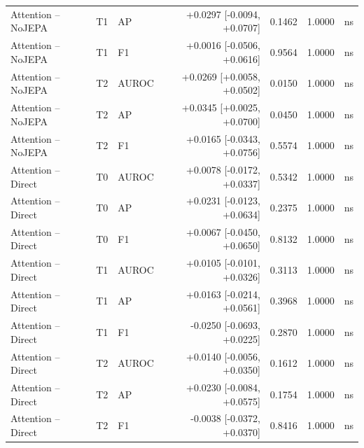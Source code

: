 \begin{table}[t]
\begin{tabular}{lllrrrc}
Attention -- NoJEPA & T1 & AP & +0.0297 [-0.0094, +0.0707] & 0.1462 & 1.0000 & ns \\
Attention -- NoJEPA & T1 & F1 & +0.0016 [-0.0506, +0.0616] & 0.9564 & 1.0000 & ns \\
Attention -- NoJEPA & T2 & AUROC & +0.0269 [+0.0058, +0.0502] & 0.0150 & 1.0000 & ns \\
Attention -- NoJEPA & T2 & AP & +0.0345 [+0.0025, +0.0700] & 0.0450 & 1.0000 & ns \\
Attention -- NoJEPA & T2 & F1 & +0.0165 [-0.0343, +0.0756] & 0.5574 & 1.0000 & ns \\
Attention -- Direct & T0 & AUROC & +0.0078 [-0.0172, +0.0337] & 0.5342 & 1.0000 & ns \\
Attention -- Direct & T0 & AP & +0.0231 [-0.0123, +0.0634] & 0.2375 & 1.0000 & ns \\
Attention -- Direct & T0 & F1 & +0.0067 [-0.0450, +0.0650] & 0.8132 & 1.0000 & ns \\
Attention -- Direct & T1 & AUROC & +0.0105 [-0.0101, +0.0326] & 0.3113 & 1.0000 & ns \\
Attention -- Direct & T1 & AP & +0.0163 [-0.0214, +0.0561] & 0.3968 & 1.0000 & ns \\
Attention -- Direct & T1 & F1 & -0.0250 [-0.0693, +0.0225] & 0.2870 & 1.0000 & ns \\
Attention -- Direct & T2 & AUROC & +0.0140 [-0.0056, +0.0350] & 0.1612 & 1.0000 & ns \\
Attention -- Direct & T2 & AP & +0.0230 [-0.0084, +0.0575] & 0.1754 & 1.0000 & ns \\
Attention -- Direct & T2 & F1 & -0.0038 [-0.0372, +0.0370] & 0.8416 & 1.0000 & ns \\
\bottomrule
\end{tabular}
\end{table}
